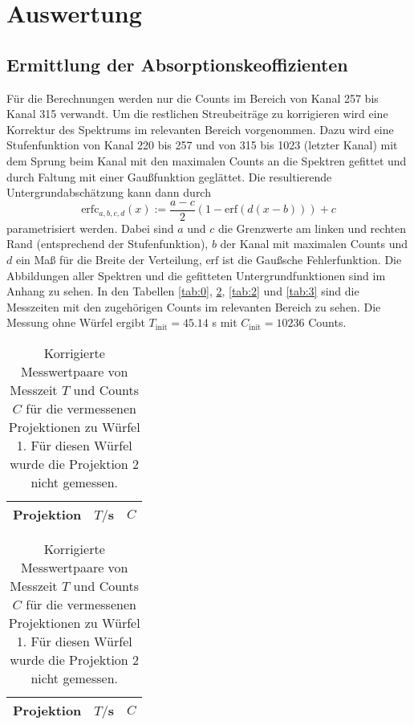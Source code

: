 

\section{Auswertung}
\subsection{Ermittlung der Absorptionskeoffizienten}
Für die Berechnungen werden nur die Counts im Bereich von Kanal 257 bis Kanal 315 verwandt.
Um die restlichen
Streubeiträge zu korrigieren wird eine Korrektur des Spektrums im relevanten Bereich vorgenommen.
Dazu wird eine Stufenfunktion von Kanal 220 bis 257 und von 315 bis 1023 (letzter Kanal) mit dem
Sprung beim Kanal mit den maximalen Counts an die Spektren gefittet und durch Faltung mit einer
Gaußfunktion geglättet. Die resultierende Untergrundabschätzung kann dann durch
\begin{equation}
\text{erfc}_{a,b,c,d}(x):=\frac{a-c}{2} \left(1-\text{erf}(d(x-b))\right)+c
\end{equation}
parametrisiert werden. Dabei sind $a$ und $c$ die Grenzwerte am linken und rechten Rand
(entsprechend der Stufenfunktion), $b$ der Kanal mit maximalen Counts und $d$ ein Maß für die
Breite der Verteilung, $\text{erf}$ ist die Gaußsche Fehlerfunktion. Die Abbildungen aller
Spektren und die gefitteten Untergrundfunktionen sind im Anhang zu sehen. In den Tabellen
\ref{tab:0}, \ref{tab:1}, \ref{tab:2} und \ref{tab:3} sind die Messzeiten mit den zugehörigen
Counts im relevanten Bereich zu sehen. Die Messung ohne Würfel ergibt $T_\text{init}=45.14$ s mit
$C_\text{init}=10236$ Counts.
\begin{table}
\centering
\begin{tabular}{ccc}
\toprule \midrule
Projektion &$T/$s & $C$ \\
\midrule

\midrule
\bottomrule
\end{tabular}
\caption{Korrigierte Messwertpaare von Messzeit $T$ und Counts $C$ für die vermessenen
Projektionen zu
Würfel 0.} \label{tab:0}

\begin{tabular}{ccc}
\toprule \midrule
Projektion &$T/$s & $C$ \\
\midrule

\midrule
\bottomrule
\end{tabular}
\caption{Korrigierte Messwertpaare von Messzeit $T$ und Counts $C$ für die vermessenen
Projektionen zu
Würfel 1. Für diesen Würfel wurde die Projektion 2 nicht gemessen.} \label{tab:1}
\end{table}

